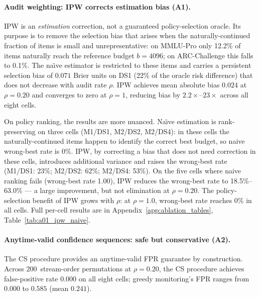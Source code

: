 \documentclass[a4paper,fleqn]{cas-sc}
\theoremstyle{plain}
\theoremstyle{definition}
\theoremstyle{remark}
\begin{document}
\paragraph{Audit weighting: IPW corrects estimation bias (A1).}
IPW is an \emph{estimation} correction, not a guaranteed policy-selection oracle.
Its purpose is to remove the selection bias that arises when the naturally-continued
fraction of items is small and unrepresentative: on MMLU-Pro only 12.2\% of items
naturally reach the reference budget $b{=}4096$; on ARC-Challenge this falls to 0.1\%.
The na\"{\i}ve estimator is restricted to these items and carries a persistent selection
bias of $0.071$ Brier units on DS1 (22\% of the oracle risk difference) that does not
decrease with audit rate $\rho$.
IPW achieves mean absolute bias $0.024$ at $\rho{=}0.20$ and converges to zero at $\rho{=}1$,
reducing bias by $2.2\times$--$23\times$ across all eight cells.

On policy ranking, the results are more nuanced.
Na\"{\i}ve estimation is rank-preserving on three cells (M1/DS1, M2/DS2, M2/DS4):
in these cells the naturally-continued items happen to identify the correct best budget,
so naive wrong-best rate is 0\%.
IPW, by correcting a bias that does not need correction in these cells, introduces
additional variance and raises the wrong-best rate (M1/DS1: 23\%; M2/DS2: 62\%;
M2/DS4: 53\%).
On the five cells where naive ranking fails (wrong-best rate 1.00), IPW reduces the
wrong-best rate to 18.5\%--63.0\% --- a large improvement, but not elimination at
$\rho{=}0.20$.
The policy-selection benefit of IPW grows with $\rho$: at $\rho{=}1.0$, wrong-best
rate reaches 0\% in all cells.
Full per-cell results are in Appendix~\ref{app:ablation_tables},
Table~\ref{tab:a01_ipw_naive}.

\paragraph{Anytime-valid confidence sequences: safe but conservative (A2).}
The CS procedure provides an anytime-valid FPR guarantee by construction.
Across 200~stream-order permutations at $\rho{=}0.20$, the CS procedure achieves
false-positive rate $0.000$ on all eight cells; greedy monitoring's FPR ranges
from $0.000$ to $0.585$ (mean $0.241$).
\end{document}
